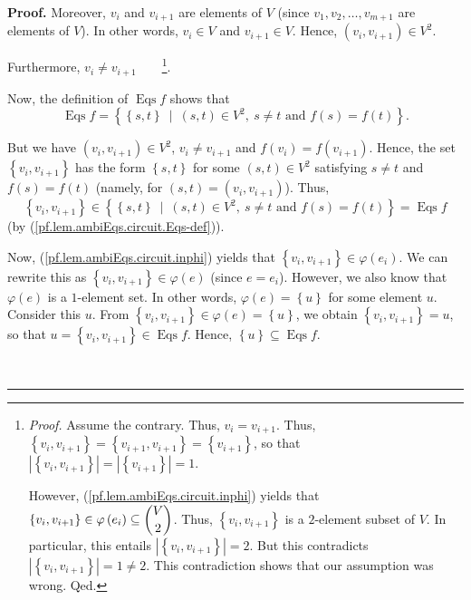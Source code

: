\documentclass[numbers=enddot,12pt,final,onecolumn,notitlepage]{scrartcl}%
\theoremstyle{definition}
\newenvironment{proof}[1][Proof]{\noindent\textbf{#1.} }{\ \rule{0.5em}{0.5em}}
\newenvironment{verlong}{}{}
\begin{document}
\begin{verlong}
\begin{proof}
Moreover, $v_{i}$ and $v_{i+1}$ are elements of $V$ (since $v_{1},v_{2}%
,\ldots,v_{m+1}$ are elements of $V$). In other words, $v_{i}\in V$ and
$v_{i+1}\in V$. Hence, $\left(  v_{i},v_{i+1}\right)  \in V^{2}$.

Furthermore, $v_{i}\neq v_{i+1}$\ \ \ \ \footnote{\textit{Proof.} Assume the
contrary. Thus, $v_{i}=v_{i+1}$. Thus, $\left\{  v_{i},v_{i+1}\right\}
=\left\{  v_{i+1},v_{i+1}\right\}  =\left\{  v_{i+1}\right\}  $, so that
$\left\vert \left\{  v_{i},v_{i+1}\right\}  \right\vert =\left\vert \left\{
v_{i+1}\right\}  \right\vert =1$.
\par
However, (\ref{pf.lem.ambiEqs.circuit.inphi}) yields that $\left\{
v_{i},v_{i+1}\right\}  \in\varphi\left(  e_{i}\right)  \subseteq\dbinom{V}{2}%
$. Thus, $\left\{  v_{i},v_{i+1}\right\}  $ is a $2$-element subset of $V$. In
particular, this entails $\left\vert \left\{  v_{i},v_{i+1}\right\}
\right\vert =2$. But this contradicts $\left\vert \left\{  v_{i}%
,v_{i+1}\right\}  \right\vert =1\neq2$. This contradiction shows that our
assumption was wrong. Qed.}.

Now, the definition of $\operatorname*{Eqs}f$ shows that%
\begin{equation}
\operatorname*{Eqs}f=\left\{  \left\{  s,t\right\}  \ \mid\ \left(
s,t\right)  \in V^{2},\ s\neq t\text{ and }f\left(  s\right)  =f\left(
t\right)  \right\}  . \label{pf.lem.ambiEqs.circuit.Eqs-def}%
\end{equation}


But we have $\left(  v_{i},v_{i+1}\right)  \in V^{2}$, $v_{i}\neq v_{i+1}$ and
$f\left(  v_{i}\right)  =f\left(  v_{i+1}\right)  $. Hence, the set $\left\{
v_{i},v_{i+1}\right\}  $ has the form $\left\{  s,t\right\}  $ for some
$\left(  s,t\right)  \in V^{2}$ satisfying $s\neq t$ and $f\left(  s\right)
=f\left(  t\right)  $ (namely, for $\left(  s,t\right)  =\left(  v_{i}%
,v_{i+1}\right)  $). Thus,%
\[
\left\{  v_{i},v_{i+1}\right\}  \in\left\{  \left\{  s,t\right\}
\ \mid\ \left(  s,t\right)  \in V^{2},\ s\neq t\text{ and }f\left(  s\right)
=f\left(  t\right)  \right\}  =\operatorname*{Eqs}f
\]
(by (\ref{pf.lem.ambiEqs.circuit.Eqs-def})).

Now, (\ref{pf.lem.ambiEqs.circuit.inphi}) yields that $\left\{  v_{i}%
,v_{i+1}\right\}  \in\varphi\left(  e_{i}\right)  $. We can rewrite this as
$\left\{  v_{i},v_{i+1}\right\}  \in\varphi\left(  e\right)  $ (since
$e=e_{i}$). However, we also know that $\varphi\left(  e\right)  $ is a
$1$-element set. In other words, $\varphi\left(  e\right)  =\left\{
u\right\}  $ for some element $u$. Consider this $u$. From $\left\{
v_{i},v_{i+1}\right\}  \in\varphi\left(  e\right)  =\left\{  u\right\}  $, we
obtain $\left\{  v_{i},v_{i+1}\right\}  =u$, so that $u=\left\{  v_{i}%
,v_{i+1}\right\}  \in\operatorname*{Eqs}f$. Hence, $\left\{  u\right\}
\subseteq\operatorname*{Eqs}f$.


\end{proof}
\end{verlong}
\end{document}
